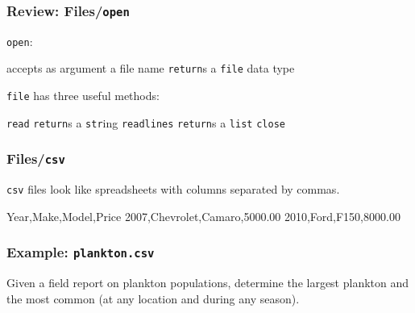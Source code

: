 \documentclass[11pt]{beamer}
\begin{document}
\begin{frame}[fragile]
  \frametitle{Review:  Files/\texttt{open}}
  \Enlarge

  \begin{itemize}
  \myitem  \texttt{open}:
    \begin{itemize}
    \mysubitem  accepts as argument a file name
    \mysubitem  \texttt{return}s a \texttt{file} data type
    \end{itemize}
    \myitem  \texttt{file} has three useful methods: %
      \begin{itemize}
      \mysubitem  \texttt{read} \texttt{return}s a \texttt{str}ing
      \mysubitem  \texttt{readlines} \texttt{return}s a \texttt{list}
      \mysubitem  \texttt{close}
      \end{itemize}
  \end{itemize}
\end{frame}

\begin{frame}[fragile]
  \frametitle{Files/\texttt{csv}}
  \Enlarge

  \begin{itemize}
  \myitem  \texttt{csv} files look like spreadsheets with columns separated by commas.
  \end{itemize}
  \begin{semiverbatim}
Year,Make,Model,Price
2007,Chevrolet,Camaro,5000.00
2010,Ford,F150,8000.00
  \end{semiverbatim}
\end{frame}

\begin{frame}[fragile]
  \frametitle{Example:  \texttt{plankton.csv}}
  \Enlarge

  \begin{itemize}
  \myitem  Given a field report on plankton populations, determine the largest plankton and the most common (at any location and during any season).
  \end{itemize}
\end{frame}
\end{document}
